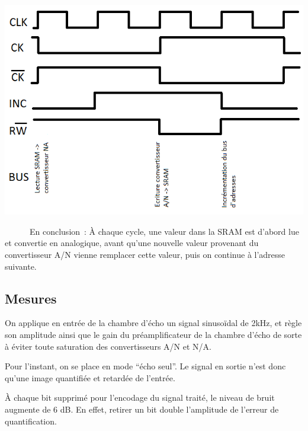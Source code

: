 \documentclass{article}
\begin{document}

\begin{minipage}{0.5\linewidth}
\includegraphics[width=\linewidth]{chronogramme_sequenceur.png}
\end{minipage}\hfill
\begin{minipage}{0.4\linewidth}
~~~~~~En conclusion~: À chaque cycle, une valeur dans la SRAM est d'abord lue et convertie en analogique, avant qu'une nouvelle valeur provenant du convertisseur A/N vienne remplacer cette valeur, puis on continue à l'adresse suivante.
\end{minipage}

\subsection{Mesures}

On applique en entrée de la chambre d'écho un signal sinusoïdal de 2kHz, et règle son amplitude ainsi que le gain du préamplificateur de la chambre d'écho de sorte à éviter toute saturation des convertisseurs A/N et N/A. 

Pour l'instant, on se place en mode ``écho seul''. Le signal en sortie n'est donc qu'une image quantifiée et retardée de l'entrée.




À chaque bit supprimé pour l'encodage du signal traité, le niveau de bruit augmente de 6 dB. En effet, retirer un bit double l'amplitude de l'erreur de quantification.
\end{document}

